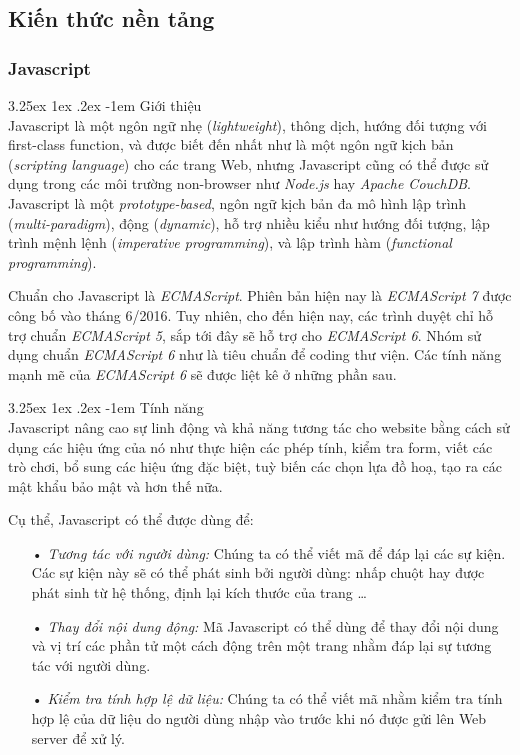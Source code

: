 \documentclass[12pt,a4paper,twoside]{article}
\makeatletter
\newcommand{\myparagraph}[1]{\paragraph{#1}\mbox{}\\} %
\renewcommand\paragraph{\@startsection{paragraph}{5}{\z@}%
  {3.25ex \@plus1ex \@minus.2ex}%
  {-1em}%
  {\normalfont\normalsize\bfseries}}
\makeatother
\begin{document}
\subsection{Kiến thức nền tảng}
\subsubsection{Javascript}
\myparagraph{Giới thiệu}
Javascript là một ngôn ngữ nhẹ (\textit{lightweight}), thông dịch, hướng đối tượng với first-class function, và được biết đến nhất như là một ngôn ngữ kịch bản (\textit{scripting language}) cho các trang Web, nhưng Javascript cũng có thể được sử dụng trong các môi trường non-browser như \textit{Node.js} hay \textit{Apache CouchDB}. Javascript là một \textit{prototype-based}, ngôn ngữ kịch bản đa mô hình lập trình (\textit{multi-paradigm}), động (\textit{dynamic}), hỗ trợ nhiều kiểu như hướng đối tượng, lập trình mệnh lệnh (\textit{imperative programming}), và lập trình hàm (\textit{functional programming}).

Chuẩn cho Javascript là \textit{ECMAScript}. Phiên bản hiện nay là \textit{ECMAScript 7} được công bố vào tháng 6/2016. Tuy nhiên, cho đến hiện nay, các trình duyệt chỉ hỗ trợ chuẩn \textit{ECMAScript 5}, sắp tới đây sẽ hỗ trợ cho \textit{ECMAScript 6}. Nhóm sử dụng chuẩn \textit{ECMAScript 6} như là tiêu chuẩn để coding thư viện. Các tính năng mạnh mẽ của \textit{ECMAScript 6} sẽ được liệt kê ở những phần sau.

\myparagraph{Tính năng}
Javascript nâng cao sự linh động và khả năng tương tác cho website bằng cách sử dụng các hiệu ứng của nó như thực hiện các phép tính, kiểm tra form, viết các trò chơi, bổ sung các hiệu ứng đặc biệt, tuỳ biến các chọn lựa đồ hoạ, tạo ra các mật khẩu bảo mật và hơn thế nữa.

Cụ thể, Javascript có thể được dùng để:
\begin{itemize}
\item[•] \emph{Tương tác với người dùng:} Chúng ta có thể viết mã để đáp lại các sự kiện. Các sự kiện này sẽ có thể phát sinh bởi người dùng: nhấp chuột hay được phát sinh từ hệ thống, định lại kích thước của trang …
\item[•] \emph{Thay đổi nội dung động:} Mã Javascript có thể dùng để thay đổi nội dung và vị trí các phần tử một cách động trên một trang nhằm đáp lại sự tương tác với người dùng.
\item[•] \emph{Kiểm tra tính hợp lệ dữ liệu:} Chúng ta có thể viết mã nhằm kiểm tra tính hợp lệ của dữ liệu do người dùng nhập vào trước khi nó được gửi lên Web server để xử lý.
\end{itemize}
\end{document}
